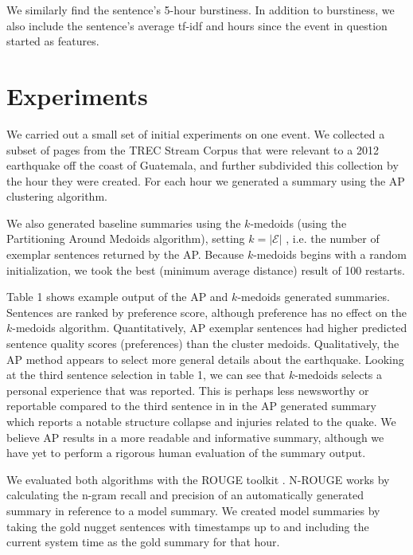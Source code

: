 \documentclass{sig-alternate} \usepackage{url} \usepackage{color}
\newcommand{\fdcomment}[1]{\textbf{\textcolor{red}{[FD: #1]}}}
\begin{document}
We similarly find the sentence's 5-hour burstiness.  In addition to
burstiness, we also include the sentence's average tf-idf and hours since the
event in question started as features.


\section{Experiments}

We carried out a small set of initial experiments on one event.  We collected
a subset of pages from the TREC Stream Corpus that were relevant to a 2012
earthquake off the coast of Guatemala, and further subdivided this collection
by the hour they were created. For each hour we generated a summary using the
AP clustering algorithm. 

 We also generated baseline summaries using the $k$-medoids (using the
 Partitioning Around Medoids algorithm), setting $k = |\mathcal{E}|$ , i.e.
 the number of exemplar sentences returned by the AP. Because $k$-medoids
 begins with a random initialization, we took the best (minimum average
 distance) result of 100 restarts.

Table 1 shows example output of the AP and $k$-medoids generated summaries.
Sentences are ranked by preference score, although preference has no effect on
the $k$-medoids algorithm.  Quantitatively, AP exemplar sentences had higher
predicted sentence quality scores (preferences) than the cluster medoids.
Qualitatively, the AP method appears to select more general details about the
earthquake. Looking at the third sentence selection in table 1, we can see
that $k$-medoids selects a personal experience that was reported. This is
perhaps less newsworthy or reportable compared to the third sentence in in the
AP generated summary which reports a notable structure collapse and injuries
related to the quake.  We believe AP results in a more readable and
informative summary, although we have yet to perform a rigorous human
evaluation of the summary output.


We evaluated both algorithms with the ROUGE toolkit \cite{lin2004rouge}.
N-ROUGE works by calculating the n-gram recall and precision of an
automatically generated summary in reference to a model summary.  We created
model summaries by taking the gold nugget sentences with timestamps up to and
including the current system time as the gold summary for that hour.
\end{document}
